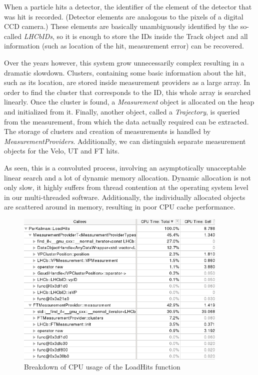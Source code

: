 \documentclass[12pt]{article}
\begin{document}
When a particle hits a detector, the identifier of the element of the detector that was hit is recorded. (Detector elements are analogous to the pixels of a digital CCD camera.) These elements are basically unambiguously identified by the so-called \textit{LHCbIDs}, so it is enough to store the IDs inside the Track object and all information (such as location of the hit, measurement error) can be recovered. 

Over the years however, this system grow unnecessarily complex resulting in a dramatic slowdown. Clusters, containing some basic information about the hit, such as its location, are stored inside measurement providers as a large array. In order to find the cluster that corresponds to the ID, this whole array is searched linearly. Once the cluster is found, a \textit{Measurement} object is allocated on the heap and initialized from it. Finally, another object, called a \textit{Trajectory}, is queried from the measurement, from which the data actually required can be extracted. The storage of clusters and creation of measurements is handled by \textit{MeasurementProviders}. Additionally, we can distinguish separate measurement objects for the Velo, UT and FT hits.

As seen, this is a convoluted process, involving an asymptotically unacceptable linear search and a lot of dynamic memory allocation. Dynamic allocation is not only slow, it highly suffers from thread contention at the operating system level in our multi-threaded software. Additionally, the individually allocated objects are scattered around in memory, resulting in poor CPU cache performance.

\begin{figure}[H]
	\begin{center}
		\includegraphics[width=0.9\textwidth]{kalmanfit_loadhits_breakdown}
	\end{center}
	\caption{Breakdown of CPU usage of the LoadHits function}
	\label{fig_kalmanfit_loadhits_breakdown}
\end{figure}
\end{document}
